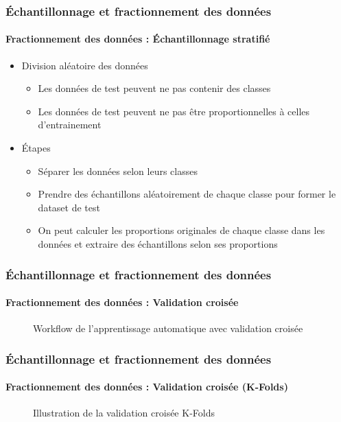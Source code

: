 \documentclass[xcolor=table]{beamer}
\begin{document}
\begin{frame}
	\frametitle{Échantillonnage et fractionnement des données}
	\framesubtitle{Fractionnement des données : Échantillonnage stratifié}
	
	\begin{itemize}
		\item Division aléatoire des données
		\begin{itemize}
			\item Les données de test peuvent ne pas contenir des classes
			\item Les données de test peuvent ne pas être proportionnelles à celles d'entrainement
		\end{itemize}
		\item Étapes
		\begin{itemize}
			\item Séparer les données selon leurs classes
			\item Prendre des échantillons aléatoirement de chaque classe pour former le dataset de test
			\item On peut calculer les proportions originales de chaque classe dans les données et extraire des échantillons selon ses proportions
		\end{itemize}
	\end{itemize}
	
\end{frame}

\begin{frame}
	\frametitle{Échantillonnage et fractionnement des données}
	\framesubtitle{Fractionnement des données : Validation croisée}
	
	\begin{figure}
		\centering
		\caption{Workflow de l'apprentissage automatique avec validation croisée \cite{2020-sklearn-man}}
	\end{figure}
	
\end{frame}


\begin{frame}
	\frametitle{Échantillonnage et fractionnement des données}
	\framesubtitle{Fractionnement des données : Validation croisée (K-Folds)}
	
	\begin{figure}
		\centering
		\caption{Illustration de la validation croisée K-Folds \cite{2020-sklearn-man}}
	\end{figure}
	
\end{frame}
\end{document}

